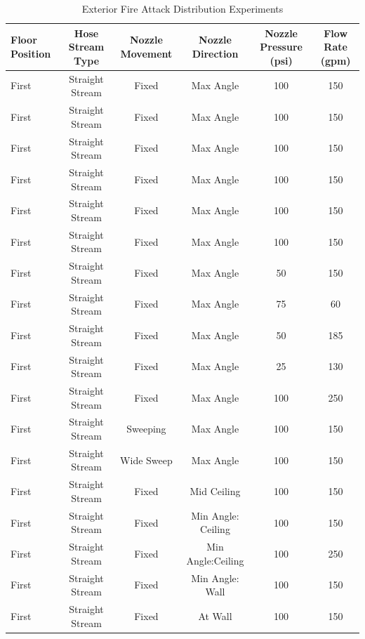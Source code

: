 \documentclass{article}
\begin{document}
\begin{table}[!ht]
\centering
\scriptsize
\caption{Exterior Fire Attack Distribution Experiments}
\label{tab:Exterior_Fire_Attack_Distribution_Experiments}
\begin{tabular}{lccccc}
\toprule[1.5pt]
{{Floor Position}}& {{Hose Stream Type}} & {{Nozzle Movement}} & {{Nozzle Direction}} & {{Nozzle Pressure (psi)}} & {Flow Rate (gpm)} \\ 
\midrule
First  & Straight Stream  & Fixed      & Max Angle               & 100 & 150 \\
First  & Straight Stream  & Fixed      & Max Angle               & 100 & 150 \\
First  & Straight Stream  & Fixed      & Max Angle               & 100 & 150 \\
First  & Straight Stream  & Fixed      & Max Angle               & 100 & 150 \\
First  & Straight Stream  & Fixed      & Max Angle               & 100 & 150 \\
First  & Straight Stream  & Fixed      & Max Angle               & 100 & 150 \\
First  & Straight Stream  & Fixed      & Max Angle               & 50 & 150 \\
First  & Straight Stream  & Fixed      & Max Angle               & 75 & 60 \\
First  & Straight Stream  & Fixed      & Max Angle               & 50 & 185 \\
First  & Straight Stream  & Fixed      & Max Angle               & 25 & 130 \\
First  & Straight Stream  & Fixed      & Max Angle               & 100 & 250 \\
First  & Straight Stream  & Sweeping   & Max Angle               & 100 & 150 \\
First  & Straight Stream  & Wide Sweep & Max Angle               & 100 & 150 \\
First  & Straight Stream  & Fixed      & Mid Ceiling             & 100 & 150 \\
First  & Straight Stream  & Fixed      & Min Angle: Ceiling      & 100 & 150 \\
First  & Straight Stream  & Fixed      & Min Angle:Ceiling       & 100 & 250 \\
First  & Straight Stream  & Fixed      & Min Angle: Wall         & 100 & 150 \\
First  & Straight Stream  & Fixed      & At Wall                 & 100 & 150 \\

\end{tabular}
\end{table}
\end{document}
